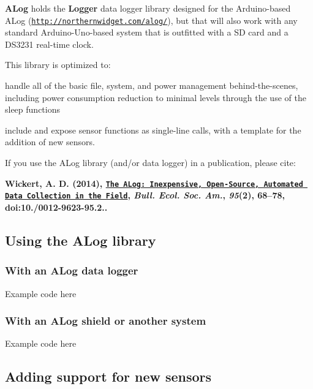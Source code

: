{\bfseries A\+Log} holds the {\bfseries Logger} data logger library designed for the Arduino-\/based A\+Log (\href{http://northernwidget.com/alog/}{\tt http\+://northernwidget.\+com/alog/}), but that will also work with any standard Arduino-\/\+Uno-\/based system that is outfitted with a SD card and a D\+S3231 real-\/time clock.

This library is optimized to\+:
\begin{DoxyEnumerate}
\item handle all of the basic file, system, and power management behind-\/the-\/scenes, including power consumption reduction to minimal levels through the use of the sleep functions
\item include and expose sensor functions as single-\/line calls, with a template for the addition of new sensors.
\end{DoxyEnumerate}

If you use the A\+Log library (and/or data logger) in a publication, please cite\+:

{\bfseries Wickert, A. D. (2014), \href{http://onlinelibrary.wiley.com/wol1/doi/10.1890/0012-9623-95.2.68/full}{\tt The A\+Log\+: Inexpensive, Open-\/\+Source, Automated Data Collection in the Field}, {\itshape Bull. Ecol. Soc. Am.}, {\itshape 95}(2), 68–78, doi\+:10./0012-\/9623-\/95.2..}

\subsection*{Using the A\+Log library}

\subsubsection*{With an A\+Log data logger}


\begin{DoxyCode}
Example code here
\end{DoxyCode}


\subsubsection*{With an A\+Log shield or another system}


\begin{DoxyCode}
Example code here
\end{DoxyCode}


\subsection*{Adding support for new sensors}


